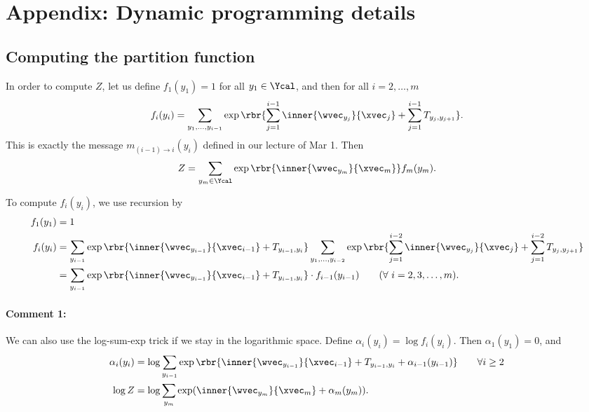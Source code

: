 \documentclass[11pt]{report}
\begin{document}
\section{Appendix: Dynamic programming details}

\subsection{Computing the partition function}

In order to compute $Z$, let us define $f_1(y_1) = 1$ for all $y_1 \in \Ycal$, and then for all $i = 2, \ldots, m$
\begin{align}
	f_i(y_i) = \sum_{y_1, \ldots, y_{i-1}} \exp \rbr{\sum_{j=1}^{i-1} \inner{\wvec_{y_j}}{\xvec_j} + \sum_{j=1}^{i-1} T_{y_j, y_{j+1}}}.
\end{align}
This is exactly the message $m_{(i-1) \to i}(y_{i})$ defined in our lecture of Mar 1.
Then
\begin{align}
  Z = \sum_{y_m \in \Ycal} \exp \rbr{\inner{\wvec_{y_m}}{\xvec_m}} f_m(y_m) .
\end{align}

To compute $f_i(y_i)$, we use recursion by
\begin{align}
\label{eq:rec_Z_forward_1}
	f_1(y_1) &= 1 \\
	f_i(y_i) &= \sum_{y_{i-1}} \exp \rbr{\inner{\wvec_{y_{i-1}}}{\xvec_{i-1}} + T_{y_{i-1}, y_i}}
	 \sum_{y_1, \ldots, y_{i-2}} \exp \rbr{\sum_{j=1}^{i-2} \inner{\wvec_{y_j}}{\xvec_j} + \sum_{j=1}^{i-2} T_{y_j, y_{j+1}}} \\
\label{eq:rec_Z_forward_2}
	 &= \sum_{y_{i-1}} \exp \rbr{\inner{\wvec_{y_{i-1}}}{\xvec_{i-1}} + T_{y_{i-1}, y_i}}  \cdot f_{i-1}(y_{i-1})  \qquad (\forall\ i = 2, 3, \ldots, m).	 
\end{align}

\paragraph{Comment 1:}
We can also use the log-sum-exp trick if we stay in the logarithmic space. 
Define $\alpha_i(y_i) = \log f_i(y_i)$.
Then $\alpha_1(y_1) = 0$, and
\begin{align}
   \alpha_i(y_i) &= \log \sum_{y_{i-1}} \exp \rbr{\inner{\wvec_{y_{i-1}}}{\xvec_{i-1}} + T_{y_{i-1}, y_i} + \alpha_{i-1}(y_{i-1})} \qquad \forall i \ge 2\\
   \log Z &= \log \sum_{y_m} \exp (\inner{\wvec_{y_m}}{\xvec_m} + \alpha_m(y_m)).
\end{align}
\end{document}
